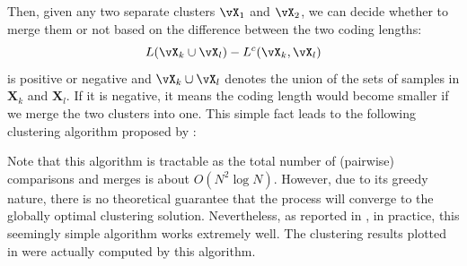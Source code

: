\documentclass[../../book-main.tex]{subfiles}
\begin{document}
Then, given any two separate clusters $\vX_1$ and $\vX_2$, we can
decide whether to merge them or not based on the difference between
the two coding lengths:
\begin{equation}
    L(\vX_k \cup \vX_l) - L^c(\vX_k, \vX_l)
\end{equation}
is positive or negative and $\vX_k \cup \vX_l$ denotes the union of the
sets of samples in $\bm X_k$ and $\bm X_l$. If it is negative, it
means the coding length would become smaller if we merge the two
clusters into one. This simple fact leads to the following clustering
algorithm proposed by \cite{ma2007segmentation}:
\begin{algorithm}[!htbp]
    \caption{Pairwise Steepest Descent of Coding
    Length}\label{alg:steepest_descent_coding_length}
    \begin{algorithmic}[1]

        \Statex{}
        \Statex{}
        \State{\Return{\(\cC\)}}
        \Else
        \Statex{}
        \EndIf
        \EndWhile
        \State{\Return{\(\cC\)}}
        \EndProcedure
    \end{algorithmic}
\end{algorithm}

Note that this algorithm is tractable as the total number of
(pairwise) comparisons and merges is about $O(N^2\log N)$. However,
due to its greedy nature, there is no theoretical guarantee that the
process will converge to the globally optimal clustering solution.
Nevertheless, as reported in \cite{ma2007segmentation}, in practice,
this seemingly simple algorithm works extremely well. The clustering
results plotted in  were actually
computed by this algorithm.
\end{document}
